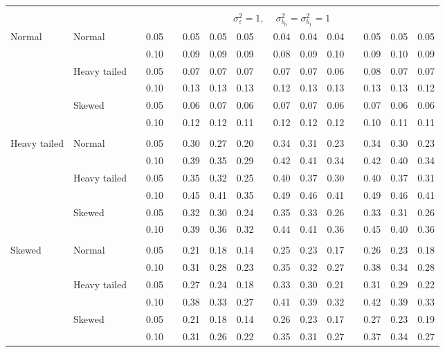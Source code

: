 \documentclass[12pt]{article} %
\begin{document}
\begin{table}[ht]
\begin{scriptsize}
\begin{center}
\begin{tabular}{ll p{.1cm} c p{.1cm} rrr p{.1cm} rrr p{.1cm} rrr}
&&&&&&&&&&&&&&&\\
& && && \multicolumn{9}{c}{$\sigma_{\varepsilon}^2 = 1$, \ \ $\sigma_{b_0}^2 = \sigma_{b_1}^2 = 1$} \\ \cline{6-16}
\rowcolor{gray!20}Normal       & Normal       && 0.05 &&   0.05 & 0.05 & 0.05 && 0.04 & 0.04 & 0.04 &&  0.05 & 0.05 & 0.05 \\ 
\rowcolor{gray!20}             &              && 0.10 &&   0.09 & 0.09 & 0.09 && 0.08 & 0.09 & 0.10 &&  0.09 & 0.10 & 0.09 \\ 
\rowcolor{gray!20}             & Heavy tailed && 0.05 &&   0.07 & 0.07 & 0.07 && 0.07 & 0.07 & 0.06 &&  0.08 & 0.07 & 0.07 \\ 
\rowcolor{gray!20}             &              && 0.10 &&   0.13 & 0.13 & 0.13 && 0.12 & 0.13 & 0.13 &&  0.13 & 0.13 & 0.12 \\ 
\rowcolor{gray!20}             & Skewed       && 0.05 &&   0.06 & 0.07 & 0.06 && 0.07 & 0.07 & 0.06 &&  0.07 & 0.06 & 0.06 \\ 
\rowcolor{gray!20}             &              && 0.10 &&   0.12 & 0.12 & 0.11 && 0.12 & 0.12 & 0.12 &&  0.10 & 0.11 & 0.11 \\ 
             &&&&&&&&&&&&&&&\\
Heavy tailed & Normal       && 0.05 &&   0.30 & 0.27 & 0.20 && 0.34 & 0.31 & 0.23 && 0.34 & 0.30 & 0.23 \\
             &              && 0.10 &&   0.39 & 0.35 & 0.29 && 0.42 & 0.41 & 0.34 && 0.42 & 0.40 & 0.34 \\ 
             & Heavy tailed && 0.05 &&   0.35 & 0.32 & 0.25 && 0.40 & 0.37 & 0.30 && 0.40 & 0.37 & 0.31 \\ 
             &              && 0.10 &&   0.45 & 0.41 & 0.35 && 0.49 & 0.46 & 0.41 && 0.49 & 0.46 & 0.41 \\ 
             & Skewed       && 0.05 &&   0.32 & 0.30 & 0.24 && 0.35 & 0.33 & 0.26 && 0.33 & 0.31 & 0.26 \\ 
             &              && 0.10 &&   0.39 & 0.36 & 0.32 && 0.44 & 0.41 & 0.36 && 0.45 & 0.40 & 0.36 \\ 
             &&&&&&&&&&&&&&&\\
Skewed       & Normal       && 0.05 &&   0.21 & 0.18 & 0.14 && 0.25 & 0.23 & 0.17 &&  0.26 & 0.23 & 0.18 \\ 
             &              && 0.10 &&   0.31 & 0.28 & 0.23 && 0.35 & 0.32 & 0.27 &&  0.38 & 0.34 & 0.28 \\ 
             & Heavy tailed && 0.05 &&   0.27 & 0.24 & 0.18 && 0.33 & 0.30 & 0.21 &&  0.31 & 0.29 & 0.22 \\ 
             &              && 0.10 &&   0.38 & 0.33 & 0.27 && 0.41 & 0.39 & 0.32 &&  0.42 & 0.39 & 0.33 \\ 
             & Skewed       && 0.05 &&   0.21 & 0.18 & 0.14 && 0.26 & 0.23 & 0.17 &&  0.27 & 0.23 & 0.19 \\ 
             &              && 0.10 &&   0.31 & 0.26 & 0.22 && 0.35 & 0.31 & 0.27 &&  0.37 & 0.34 & 0.27 \\ 


\end{tabular}
\end{center}
\end{scriptsize}
\end{table}
\end{document}

